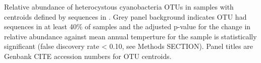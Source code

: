Relative abundance of heterocystous cyanobacteria OTUs in \citet{Garcia_Pichel_2013} samples with centroids defined by sequences in \citet{Yeager}. Grey panel background indicates OTU had sequences in at least 40\% of samples and the adjusted p-value for the change in relative abundance against mean annual temperture for the sample is statistically significant (false discovery rate < 0.10, see Methods SECTION). Panel titles are Genbank CITE accession numbers for OTU centroids. 